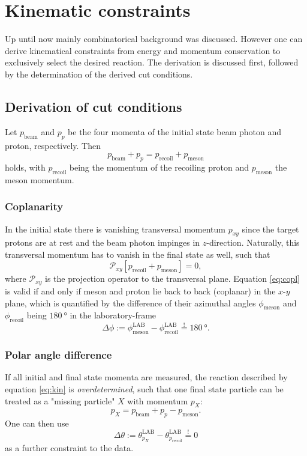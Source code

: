 \section{Kinematic constraints}
Up until now mainly combinatorical background was discussed. However one can derive kinematical constraints from energy and momentum conservation to exclusively select the desired reaction. The derivation is discussed first, followed by the determination of the derived cut conditions.
\subsection{Derivation of cut conditions}
Let $p_\text{beam}$ and $p_p$ be the four momenta of the initial state beam photon and proton, respectively. Then \begin{equation}
	p_\text{beam}+p_p=p_\text{recoil}+p_\text{meson}
	\label{eq:kin}
\end{equation}
holds, with $p_\text{recoil}$ being the momentum of the recoiling proton and $p_\text{meson}$ the meson momentum.
\subsubsection{Coplanarity}
In the initial state there is vanishing transversal momentum $p_{xy}$ since the target protons are at rest and the beam photon impinges in $z$-direction. Naturally, this transversal momentum has to vanish in the final state as well, such that \begin{equation}
	\mathcal{P}_{xy} \left[p_\text{recoil}+p_\text{meson}\right]=0,
	\label{eq:copl}
\end{equation}
where $\mathcal{P}_{xy}$ is the projection operator to the transversal plane. Equation \eqref{eq:copl} is valid if and only if meson and proton lie back to back (coplanar) in the $x$-$y$ plane, which is quantified by the difference of their azimuthal angles $\phi_\text{meson}$ and $\phi_\text{recoil}$ being $\SI{180}{\degree}$ in the laboratory-frame
\begin{equation}
	\Delta\phi:=\phi_\text{meson}^\text{LAB}-\phi_\text{recoil}^\text{LAB}\overset{!}{=}\SI{180}{\degree}.
\end{equation}
\subsubsection{Polar angle difference}
If all initial and final state momenta are measured, the reaction described by equation \eqref{eq:kin} is \emph{overdetermined}, such that one final state particle can be treated as a "missing particle" $X$ with momentum $p_X$: 
\begin{equation}
	p_X=p_\text{beam}+p_p-p_\text{meson}.
	\label{eq:polangle}
\end{equation}
One can then use 
\begin{equation}
\Delta\theta:=\theta_{p_X}^\text{LAB}-\theta_{p_\text{recoil}}^\text{LAB}\overset{!}{=}0
\label{eq:polarangle}	
\end{equation}
as a further constraint to the data.
